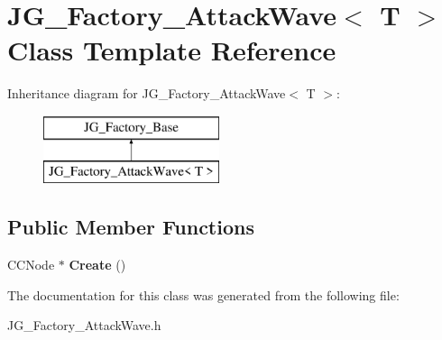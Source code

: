 \hypertarget{class_j_g___factory___attack_wave}{\section{J\-G\-\_\-\-Factory\-\_\-\-Attack\-Wave$<$ T $>$ Class Template Reference}
\label{class_j_g___factory___attack_wave}
}
Inheritance diagram for J\-G\-\_\-\-Factory\-\_\-\-Attack\-Wave$<$ T $>$\-:\begin{figure}[H]
\begin{center}
\leavevmode
\includegraphics[height=2.000000cm]{class_j_g___factory___attack_wave}
\end{center}
\end{figure}
\subsection*{Public Member Functions}
\begin{DoxyCompactItemize}
\item 
\hypertarget{class_j_g___factory___attack_wave_a5d2f15ad078b1965dc98942fb601b895}{C\-C\-Node $\ast$ {\bfseries Create} ()}\label{class_j_g___factory___attack_wave_a5d2f15ad078b1965dc98942fb601b895}

\end{DoxyCompactItemize}


The documentation for this class was generated from the following file\-:\begin{DoxyCompactItemize}
\item 
J\-G\-\_\-\-Factory\-\_\-\-Attack\-Wave.\-h\end{DoxyCompactItemize}
